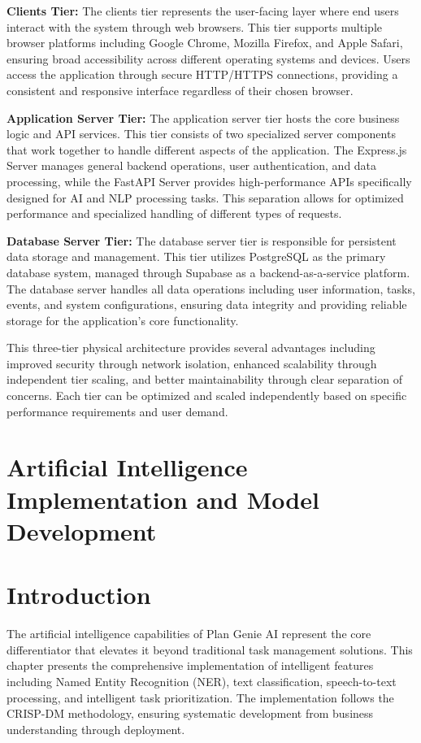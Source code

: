 \documentclass[12pt,a4paper]{article}
\begin{document}
\textbf{Clients Tier:}
The clients tier represents the user-facing layer where end users interact with the system through web browsers. This tier supports multiple browser platforms including Google Chrome, Mozilla Firefox, and Apple Safari, ensuring broad accessibility across different operating systems and devices. Users access the application through secure HTTP/HTTPS connections, providing a consistent and responsive interface regardless of their chosen browser.

\textbf{Application Server Tier:}
The application server tier hosts the core business logic and API services. This tier consists of two specialized server components that work together to handle different aspects of the application. The Express.js Server manages general backend operations, user authentication, and data processing, while the FastAPI Server provides high-performance APIs specifically designed for AI and NLP processing tasks. This separation allows for optimized performance and specialized handling of different types of requests.

\textbf{Database Server Tier:}
The database server tier is responsible for persistent data storage and management. This tier utilizes PostgreSQL as the primary database system, managed through Supabase as a backend-as-a-service platform. The database server handles all data operations including user information, tasks, events, and system configurations, ensuring data integrity and providing reliable storage for the application's core functionality.

This three-tier physical architecture provides several advantages including improved security through network isolation, enhanced scalability through independent tier scaling, and better maintainability through clear separation of concerns. Each tier can be optimized and scaled independently based on specific performance requirements and user demand.

\newpage
\section{Artificial Intelligence Implementation and Model Development}

\section*{Introduction}

The artificial intelligence capabilities of Plan Genie AI represent the core differentiator that elevates it beyond traditional task management solutions. This chapter presents the comprehensive implementation of intelligent features including Named Entity Recognition (NER), text classification, speech-to-text processing, and intelligent task prioritization. The implementation follows the CRISP-DM methodology, ensuring systematic development from business understanding through deployment.
\end{document}
